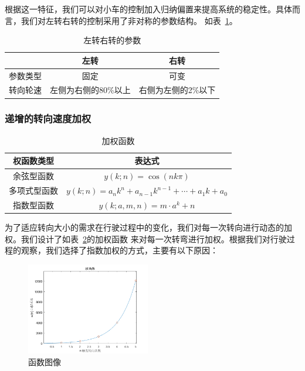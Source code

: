 \documentclass[a4paper,twoside,zihao=5,UTF8]{ctexart}
\begin{document}
\begin{spacing}{1.2}
根据这一特征，我们可以对小车的控制加入归纳偏置来提高系统的稳定性。具体而言，我们对左转右转的控制采用了非对称的参数结构。
如表~\ref{tbl:turnparam}。

\begin{table}[htb]
	\centering
	\renewcommand\arraystretch{1.5}
	\caption{左转右转的参数}
	\label{tbl:turnparam}
	\begin{tabular}{c|c|c}
		\toprule
		\hline
		& 左转 & 右转 \\
		\hline
		参数类型 & 固定 & 可变 \\
		\hline
		转向轮速 & 左侧为右侧的80\%以上 & 右侧为左侧的2\%以下 \\
		\hline
		\bottomrule
	\end{tabular}
\end{table}

\subsubsection{递增的转向速度加权}

\begin{table}[htb]
	\centering
	\caption{加权函数}
	\label{tbl:weight}
	\renewcommand\arraystretch{1.5}
	\begin{tabular}{c|c}
		\toprule
		\hline
		权函数类型 & 表达式 \\
		\hline
		余弦型函数 & $y(k;n)=\cos(nk\pi)$ \\
		\hline
		多项式型函数 & $y(k;n)=a_nk^n+a_{n-1}k^{n-1}+\cdots+a_1k+a_0$ \\
		\hline
		指数型函数 & $y(k;a,m,n)=m\cdot a^k+n$ \\
		\hline
		\bottomrule
	\end{tabular}
\end{table}

为了适应转向大小的需求在行驶过程中的变化，我们对每一次转向进行动态的加权。我们设计了如表~\ref{tbl:weight}的加权函数
来对每一次转弯进行加权。根据我们对行驶过程的观察，我们选择了指数加权的方式，主要有以下原因：

\begin{figure}[htb]
	\centering
	\caption{函数图像}
	\label{fig:weight}
	\includegraphics[width=0.48\textwidth]{weight.png}
\end{figure}


\end{spacing}
\end{document}
